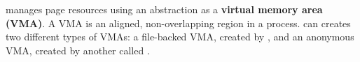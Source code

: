 \label{sec:abi:memory}




\Thehostabi{} manages page resources using an abstraction as 
a {\bf virtual memory area (VMA)}. A VMA is an aligned, non-overlapping region
in a process. %
\Thehostabi{} can creates
two different types of VMAs: a file-backed VMA, created by , and an anonymous VMA, created by another \hostapi{} called .










